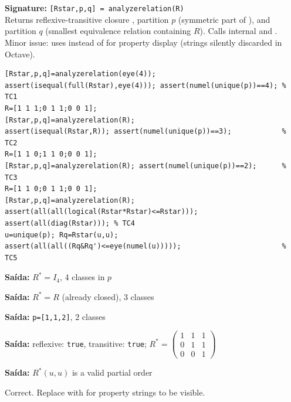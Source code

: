 \chapter{}
\begin{tcolorbox}[Abox,title={Analysis}]
\textbf{Signature:} \lstinline|[Rstar,p,q] = analyzerelation(R)|\\
Returns reflexive-transitive closure , partition $p$ (symmetric part of ), and partition $q$ (smallest equivalence relation containing $R$). Calls internal  and . Minor issue: uses  instead of  for property display (strings silently discarded in Octave).
\end{tcolorbox}
\begin{lstlisting}[caption={Tests for analyzerelation.m}]
[Rstar,p,q]=analyzerelation(eye(4));
assert(isequal(full(Rstar),eye(4))); assert(numel(unique(p))==4); % TC1
R=[1 1 1;0 1 1;0 0 1];
[Rstar,p,q]=analyzerelation(R);
assert(isequal(Rstar,R)); assert(numel(unique(p))==3);            % TC2
R=[1 1 0;1 1 0;0 0 1];
[Rstar,p,q]=analyzerelation(R); assert(numel(unique(p))==2);      % TC3
R=[1 1 0;0 1 1;0 0 1];
[Rstar,p,q]=analyzerelation(R);
assert(all(all(logical(Rstar*Rstar)<=Rstar))); assert(all(diag(Rstar))); % TC4
u=unique(p); Rq=Rstar(u,u);
assert(all(all((Rq&Rq')<=eye(numel(u)))));                        % TC5
\end{lstlisting}
\begin{tcolorbox}[Pbox,title={TC1 -- Identity relation}]
\textbf{Saída:} $R^*=I_4$, 4 classes in $p$ \quad \APROVADO
\end{tcolorbox}
\begin{tcolorbox}[Pbox,title={TC2 -- Total order $1\leq2\leq3$}]
\textbf{Saída:} $R^*=R$ (already closed), 3 classes \quad \APROVADO
\end{tcolorbox}
\begin{tcolorbox}[Pbox,title={TC3 -- Equivalence $\{1\sim2\}+\{3\}$}]
\textbf{Saída:} \texttt{p=[1,1,2]}, 2 classes \quad \APROVADO
\end{tcolorbox}
\begin{tcolorbox}[Pbox,title={TC4 -- Closure is reflexive and transitive}]
\textbf{Saída:} reflexive: \texttt{true}, transitive: \texttt{true}; $R^*=\begin{pmatrix}1&1&1\\0&1&1\\0&0&1\end{pmatrix}$ \quad \APROVADO
\end{tcolorbox}
\begin{tcolorbox}[Pbox,title={TC5 -- Quotient is antisymmetric}]
\textbf{Saída:} $R^*(u,u)$ is a valid partial order \quad \APROVADO
\end{tcolorbox}
\begin{concl}
Correct. Replace  with  for property strings to be visible.
\end{concl}

